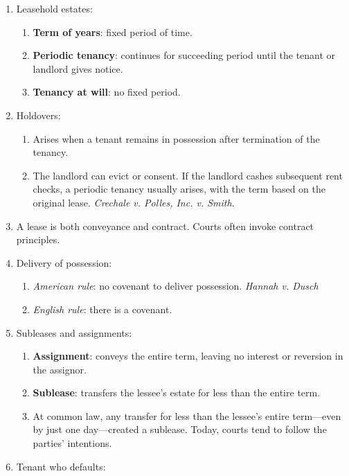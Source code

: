 \begin{enumerate}
    \item Leasehold estates:
    \begin{enumerate}
        \item \textbf{Term of years}: fixed period of time.
        \item \textbf{Periodic tenancy}: continues for succeeding period until 
        the tenant or landlord gives notice.
        \item \textbf{Tenancy at will}: no fixed period.
    \end{enumerate}
    \item Holdovers:
    \begin{enumerate}
        \item Arises when a tenant remains in possession after termination of 
        the tenancy.
        \item The landlord can evict or consent. If the landlord cashes 
        subsequent rent checks, a periodic tenancy usually arises, with the 
        term based on the original lease. \emph{Crechale v. Polles, Inc. v. 
        Smith}.
    \end{enumerate}
    \item A lease is both conveyance and contract. Courts often invoke 
    contract principles.
    \item Delivery of possession:
    \begin{enumerate}
        \item \emph{American rule}: no covenant to deliver possession. 
        \emph{Hannah v. Dusch}
        \item \emph{English rule}: there is a covenant.
    \end{enumerate}
    \item Subleases and assignments:
    \begin{enumerate}
        \item \textbf{Assignment}: conveys the entire term, leaving no 
        interest or reversion in the assignor.
        \item \textbf{Sublease}: transfers the lessee's estate for less than 
        the entire term.
        \item At common law, any transfer for less than the lessee's entire 
        term---even by just one day---created a sublease. Today, courts tend 
        to follow the parties' intentions.
    \end{enumerate}
    \item Tenant who defaults:
    \begin{enumerate}

\end{enumerate}
\end{enumerate}
